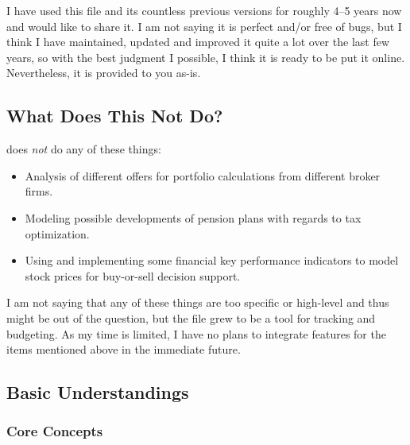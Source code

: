 I have used this file and its countless previous versions for roughly 4--5 years now and would like to share it.
I am not saying it is perfect and/or free of bugs, but I think I have maintained, updated and improved it quite a lot over the last few years, so with the best judgment I possible, I think it is ready to be put it online.
Nevertheless, it is provided to you as-is.

\subsection{What Does This Not Do?}
\label{subsec:not-included}

\tfn does \emph{not} do any of these things:
\begin{itemize}
	\item Analysis of different offers for portfolio calculations from different broker firms.
	\item Modeling possible developments of pension plans with regards to tax optimization.
	\item Using and implementing some financial key performance indicators to model stock prices for buy-or-sell decision support.
\end{itemize}
I am not saying that any of these things are too specific or high-level and thus might be out of the question, but the file grew to be a tool for tracking and budgeting.
As my time is limited, I have no plans to integrate features for the items mentioned above in the immediate future.

\subsection{Basic Understandings}
\label{subsec:basic-understandings}

\subsubsection{Core Concepts}
\label{subsubsec:core-concepts}

